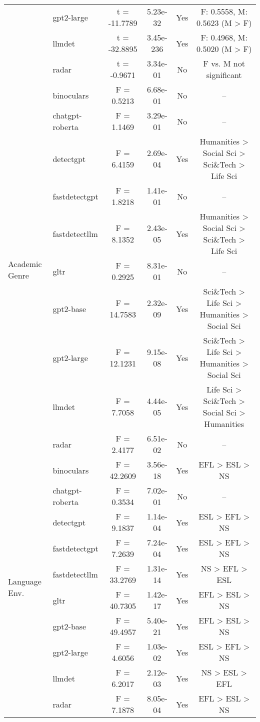 \begin{table*}[ht!]
\begin{tabular}{llcccc}
 & gpt2-large & t = -11.7789 & 5.23e-32 & Yes & F: 0.5558, M: 0.5623 (M > F) \\
 & llmdet & t = -32.8895 & 3.45e-236 & Yes & F: 0.4968, M: 0.5020 (M > F) \\
 & radar & t = -0.9671 & 3.34e-01 & No & F vs. M not significant \\
\midrule
\multirow{10}{*}{Academic Genre} & binoculars & F = 0.5213 & 6.68e-01 & No & -- \\
 & chatgpt-roberta & F = 1.1469 & 3.29e-01 & No & -- \\
 & detectgpt & F = 6.4159 & 2.69e-04 & Yes & Humanities > Social Sci > Sci\&Tech > Life Sci \\
 & fastdetectgpt & F = 1.8218 & 1.41e-01 & No & -- \\
 & fastdetectllm & F = 8.1352 & 2.43e-05 & Yes & Humanities > Social Sci > Sci\&Tech > Life Sci \\
 & gltr & F = 0.2925 & 8.31e-01 & No & -- \\
 & gpt2-base & F = 14.7583 & 2.32e-09 & Yes & Sci\&Tech > Life Sci > Humanities > Social Sci \\
 & gpt2-large & F = 12.1231 & 9.15e-08 & Yes & Sci\&Tech > Life Sci > Humanities > Social Sci \\
 & llmdet & F = 7.7058 & 4.44e-05 & Yes & Life Sci > Sci\&Tech > Social Sci > Humanities \\
 & radar & F = 2.4177 & 6.51e-02 & No & -- \\
\midrule
\multirow{10}{*}{Language Env.} & binoculars & F = 42.2609 & 3.56e-18 & Yes & EFL > ESL > NS \\
 & chatgpt-roberta & F = 0.3534 & 7.02e-01 & No & -- \\
 & detectgpt & F = 9.1837 & 1.14e-04 & Yes & ESL > EFL > NS \\
 & fastdetectgpt & F = 7.2639 & 7.24e-04 & Yes & ESL > EFL > NS \\
 & fastdetectllm & F = 33.2769 & 1.31e-14 & Yes & NS > EFL > ESL \\
 & gltr & F = 40.7305 & 1.42e-17 & Yes & EFL > ESL > NS \\
 & gpt2-base & F = 49.4957 & 5.40e-21 & Yes & EFL > ESL > NS \\
 & gpt2-large & F = 4.6056 & 1.03e-02 & Yes & ESL > EFL > NS \\
 & llmdet & F = 6.2017 & 2.12e-03 & Yes & NS > ESL > EFL \\
 & radar & F = 7.1878 & 8.05e-04 & Yes & EFL > ESL > NS \\
\bottomrule
\end{tabular}
\caption{Single Factor and Matched Subset Results: Weighted ANOVA results for CEFR, Academic Genre, and Language Environment; Weighted T-test results for Sex.  "Statistic" indicates the test statistic (F for ANOVA, t for T-test). "Sig?" indicates omnibus significance. "Ranking" shows LS-means. A ``--'' indicates that the overall ANOVA for that factor and detector was not statistically significant, so LSMeans are not reported.}
\label{tab:combined_results}
\end{table*}








